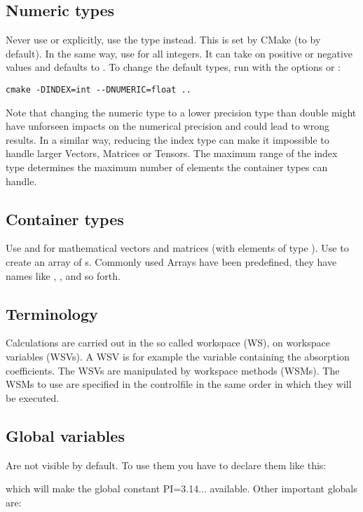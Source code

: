 \subsection{Numeric types} Never use  or
 explicitly, use the type  instead.
This is set by CMake (to  by default).
In the same way, use  for all integers. It can take on
positive or negative values and defaults to .
To change the default types, run  with the options
 or :

{\small
\begin{verbatim}
cmake -DINDEX=int --DNUMERIC=float ..
\end{verbatim}
}

Note that changing the numeric type to a lower precision type than
double might have unforseen impacts on the numerical precision and could
lead to wrong results. In a similar way, reducing the index type can
make it impossible to handle larger Vectors, Matrices or Tensors. The
maximum range of the index type determines the maximum number of
elements the container types can handle.

\subsection{Container types} Use  and
 for mathematical vectors and matrices (with elements
of type ). Use  to
create an array of s.
Commonly used Arrays have been predefined, they have names like
, , and so forth.

\subsection{Terminology}
Calculations are carried out in the so called workspace (WS), on
workspace variables (WSVs). A WSV is for example the variable
containing the absorption coefficients. The WSVs are manipulated by 
workspace methods (WSMs). The WSMs to use are specified in the
controlfile in the same order in which they will be
executed. 

\subsection{Global variables}
   Are not visible by default. To use them you have to declare them
   like this:
   \begin{quote}
   \end{quote}
   which will make the global constant PI=3.14... available. Other important globals are:

